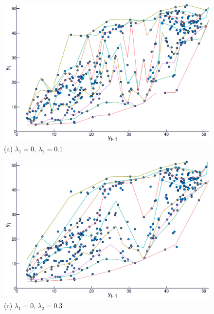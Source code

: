 \begin{figure}[htp]
  \centering
  \begin{minipage}[t]{0.4\linewidth}
    \centering
    \begin{minipage}[t]{\linewidth}
      \centering     \includegraphics[width=\textwidth]{Images/icaraizinho-crossing-01}
	  {(a) $\lambda_1 = 0, \, \lambda_2 = 0.1$}
    \end{minipage}
    \begin{minipage}[b]{\linewidth}
      \centering     \includegraphics[width=\textwidth]{Images/icaraizinho-crossing-03}
      {(c) $\lambda_1 = 0, \, \lambda_2 = 0.3$}
    \end{minipage}
     \begin{minipage}[b]{\linewidth}

\end{minipage}
\end{minipage}
\end{figure}
